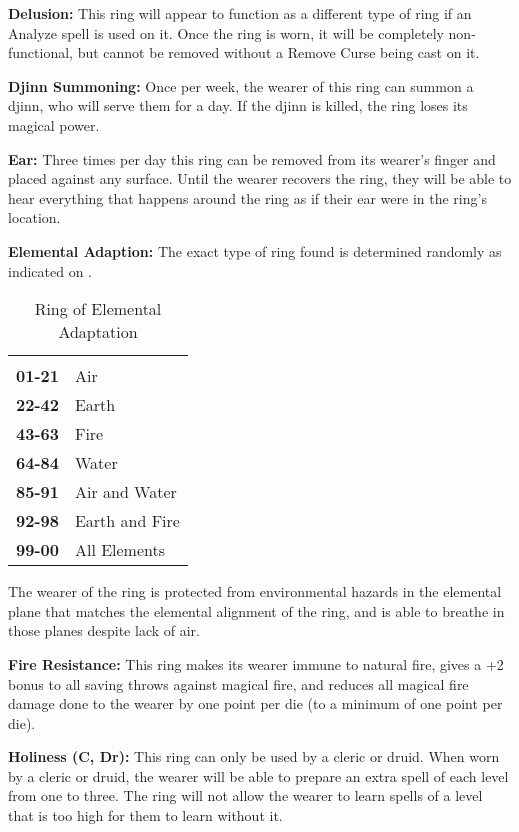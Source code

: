 \begin{multicols*}{2}
\textbf{Delusion:} This ring will appear to function as a different type of ring if an Analyze spell is used on it. Once the ring is worn, it will be completely non-functional, but cannot be removed without a Remove Curse being cast on it.

\textbf{Djinn Summoning:} Once per week, the wearer of this ring can summon a djinn, who will serve them for a day. If the djinn is killed, the ring loses its magical power.

\textbf{Ear:} Three times per day this ring can be removed from its wearer’s finger and placed against any surface. Until the wearer recovers the ring, they will be able to hear everything that happens around the ring as if their ear were in the ring’s location.

\textbf{Elemental Adaption:} The exact type of ring found is determined randomly as indicated on .

\begin {table}[H]
  \caption{Ring of Elemental Adaptation}\label{tab:Ring of Elemental Adaptation}
  \begin{tabularx}{\columnwidth}{>{\bfseries}YY}
	 & \\
	01-21 & Air\\
	22-42 & Earth\\
	43-63 & Fire\\
	64-84 & Water\\
	85-91 & Air and Water\\
	92-98 & Earth and Fire\\
	99-00 & All Elements
  \end {tabularx}
\end {table}

The wearer of the ring is protected from environmental hazards in the elemental plane that matches the elemental alignment of the ring, and is able to breathe in those planes despite lack of air.

\textbf{Fire Resistance:} This ring makes its wearer immune to natural fire, gives a +2 bonus to all saving throws against magical fire, and reduces all magical fire damage done to the wearer by one point per die (to a minimum of one point per die).

\textbf{Holiness (C, Dr):} This ring can only be used by a cleric or druid. When worn by a cleric or druid, the wearer will be able to prepare an extra spell of each level from one to three. The ring will not allow the wearer to learn spells of a level that is too high for them to learn without it.


\end{multicols*}
